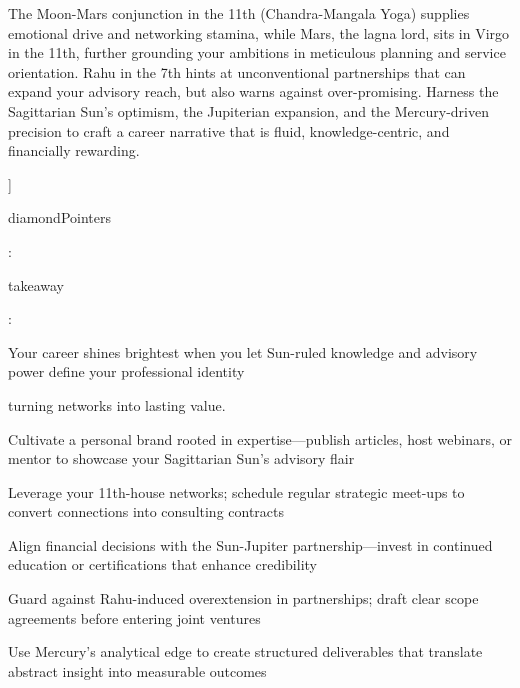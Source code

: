 {\fontsize{9}{13}\selectfont The Moon-Mars conjunction in the 11th (Chandra-Mangala Yoga) supplies emotional drive and networking stamina, while Mars, the lagna lord, sits in Virgo in the 11th, further grounding your ambitions in meticulous planning and service orientation. Rahu in the 7th hints at unconventional partnerships that can expand your advisory reach, but also warns against over-promising. Harness the Sagittarian Sun's optimism, the Jupiterian expansion, and the Mercury-driven precision to craft a career narrative that is fluid, knowledge-centric, and financially rewarding.}\par\vspace{1.8mm}

{\fontsize{9}{13}\selectfont ]}\par\vspace{1.8mm}

{\fontsize{9}{13}\selectfont diamondPointers}\par\vspace{1.8mm}

{\fontsize{9}{13}\selectfont :}\par\vspace{1.8mm}

{\fontsize{9}{13}\selectfont takeaway}\par\vspace{1.8mm}

{\fontsize{9}{13}\selectfont :}\par\vspace{1.8mm}

{\fontsize{9}{13}\selectfont Your career shines brightest when you let Sun-ruled knowledge and advisory power define your professional identity}\par\vspace{1.8mm}

{\fontsize{9}{13}\selectfont turning networks into lasting value.}\par\vspace{1.8mm}

\begin{diamondlist}
  \item {\fontsize{8.5}{12}\selectfont Cultivate a personal brand rooted in expertise---publish articles, host webinars, or mentor to showcase your Sagittarian Sun's advisory flair}
  \item {\fontsize{8.5}{12}\selectfont Leverage your 11th-house networks; schedule regular strategic meet-ups to convert connections into consulting contracts}
  \item {\fontsize{8.5}{12}\selectfont Align financial decisions with the Sun-Jupiter partnership---invest in continued education or certifications that enhance credibility}
  \item {\fontsize{8.5}{12}\selectfont Guard against Rahu-induced overextension in partnerships; draft clear scope agreements before entering joint ventures}
  \item {\fontsize{8.5}{12}\selectfont Use Mercury's analytical edge to create structured deliverables that translate abstract insight into measurable outcomes}
\end{diamondlist}

